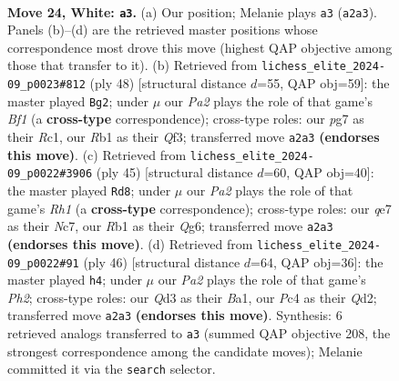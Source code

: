 \documentclass[11pt]{article}
\begin{document}
\clearpage

\begin{figure}[p]\centering
\begin{subfigure}{0.46\textwidth}\centering
\resizebox{\linewidth}{!}{%
\newchessgame
\chessboard[
  setfen={1r4k1/p1ppq1pp/5p2/6n1/1pPP4/3Q4/P1P1BP1P/1R4K1 w - - 2 24},
  showmover=false,
  pgfstyle=straightmove, color=movearrow, markmove={a2-a3}
]}
\caption{}
\end{subfigure}\hfill
\begin{subfigure}{0.46\textwidth}\centering
\resizebox{\linewidth}{!}{%
\newchessgame
\chessboard[
  setfen={r5k1/p1q2ppp/2p1np2/2P5/8/P4QPP/5P2/2R2BK1 w - - 1 25},
  showmover=false,
  pgfstyle=straightmove, color=movearrow, markmove={f1-g2}
]}
\caption{}
\end{subfigure}
\\[4pt]
\begin{subfigure}{0.46\textwidth}\centering
\resizebox{\linewidth}{!}{%
\newchessgame
\chessboard[
  setfen={2k4r/ppn2ppp/6q1/1P2p3/P1P5/2N1P3/1Q4PP/3R2K1 b - - 0 23},
  showmover=false,
  pgfstyle=straightmove, color=movearrow, markmove={h8-d8}
]}
\caption{}
\end{subfigure}\hfill
\begin{subfigure}{0.46\textwidth}\centering
\resizebox{\linewidth}{!}{%
\newchessgame
\chessboard[
  setfen={r5k1/pp2r2p/1q3pp1/2pP4/4PP2/5P2/P2Q1K1P/B5R1 w - - 2 24},
  showmover=false,
  pgfstyle=straightmove, color=movearrow, markmove={h2-h4}
]}
\caption{}
\end{subfigure}
\caption{\textbf{Move 24, White: \texttt{a3}.} (a) Our position; Melanie plays \texttt{a3} (\texttt{a2a3}). Panels (b)--(d) are the retrieved master positions whose correspondence most drove this move (highest QAP objective among those that transfer to it). (b) Retrieved from \texttt{lichess\_elite\_2024-09\_p0023\#812} (ply 48) [structural distance $d$=55, QAP obj=59]: the master played \texttt{Bg2}; under $\mu$ our \emph{Pa2} plays the role of that game's \emph{Bf1} (a \textbf{cross-type} correspondence); cross-type roles: our \emph{p}g7 as their \emph{R}c1, our \emph{R}b1 as their \emph{Q}f3; transferred move \texttt{a2a3} \textbf{(endorses this move)}. (c) Retrieved from \texttt{lichess\_elite\_2024-09\_p0022\#3906} (ply 45) [structural distance $d$=60, QAP obj=40]: the master played \texttt{Rd8}; under $\mu$ our \emph{Pa2} plays the role of that game's \emph{Rh1} (a \textbf{cross-type} correspondence); cross-type roles: our \emph{q}e7 as their \emph{N}c7, our \emph{R}b1 as their \emph{Q}g6; transferred move \texttt{a2a3} \textbf{(endorses this move)}. (d) Retrieved from \texttt{lichess\_elite\_2024-09\_p0022\#91} (ply 46) [structural distance $d$=64, QAP obj=36]: the master played \texttt{h4}; under $\mu$ our \emph{Pa2} plays the role of that game's \emph{Ph2}; cross-type roles: our \emph{Q}d3 as their \emph{B}a1, our \emph{P}c4 as their \emph{Q}d2; transferred move \texttt{a2a3} \textbf{(endorses this move)}. Synthesis: 6 retrieved analogs transferred to \texttt{a3} (summed QAP objective 208, the strongest correspondence among the candidate moves); Melanie committed it via the \texttt{search} selector.}
\label{fig:thought-m46}
\end{figure}
\end{document}
